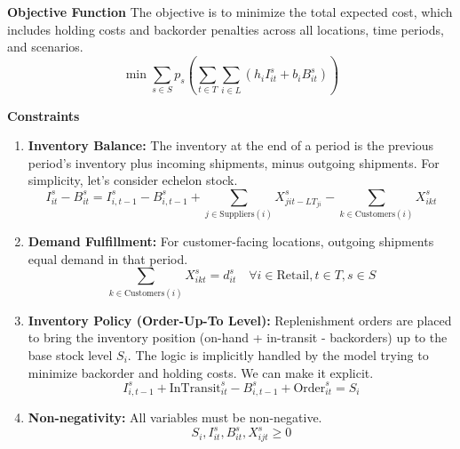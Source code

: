\documentclass{article}
\begin{document}
\textbf{Objective Function}
The objective is to minimize the total expected cost, which includes holding costs and backorder penalties across all locations, time periods, and scenarios.
\begin{equation}
\min \sum_{s \in S} p_s \left( \sum_{t \in T} \sum_{i \in L} (h_i I_{it}^s + b_i B_{it}^s) \right)
\end{equation}

\textbf{Constraints}
\begin{enumerate}
    \item \textbf{Inventory Balance:} The inventory at the end of a period is the previous period's inventory plus incoming shipments, minus outgoing shipments. For simplicity, let's consider echelon stock.
    \begin{equation}
    I_{it}^s - B_{it}^s = I_{i,t-1}^s - B_{i,t-1}^s + \sum_{j \in \text{Suppliers}(i)} X_{jit-LT_{ji}}^s - \sum_{k \in \text{Customers}(i)} X_{ikt}^s
    \end{equation}
    \item \textbf{Demand Fulfillment:} For customer-facing locations, outgoing shipments equal demand in that period.
    \begin{equation}
    \sum_{k \in \text{Customers}(i)} X_{ikt}^s = d_{it}^s \quad \forall i \in \text{Retail}, t \in T, s \in S
    \end{equation}
    \item \textbf{Inventory Policy (Order-Up-To Level):} Replenishment orders are placed to bring the inventory position (on-hand + in-transit - backorders) up to the base stock level $S_i$. The logic is implicitly handled by the model trying to minimize backorder and holding costs. We can make it explicit.
    \begin{equation}
    I_{i,t-1}^s + \text{InTransit}_{it}^s - B_{i,t-1}^s + \text{Order}_{it}^s = S_i
    \end{equation}
    \item \textbf{Non-negativity:} All variables must be non-negative.
    \begin{equation}
    S_i, I_{it}^s, B_{it}^s, X_{ijt}^s \geq 0
    \end{equation}
\end{enumerate}
\end{document}
